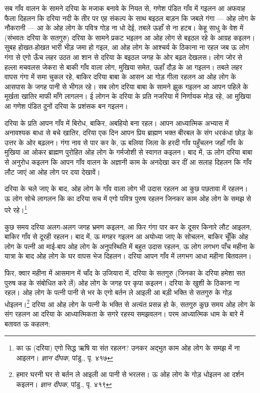 सब गाँव वालन के सामने दरिया के मजाक बनावे के नियत से, गणेश पंडित गाँव में गइलन आ अफवाह फैला दिहलन कि दरिया नदी के तीर पर एह संकल्प के साथ बइठल बाड़न कि जबले गंगा — ओह लोग के नौकरानी — आ के ओह लोग के पवित्र गोड़ ना धो देई, तबले ऊहाँ से ना हटब। केहू साधु के वेश में (संभवतः दरिया के सतगुरु) दरिया के सामने प्रकट भइलन आ ओह लोग से बइठल रहे के आग्रह कइलन। सुबह होखत-होखत भारी भीड़ जमा हो गइल, आ ओह लोग के आश्चर्य के ठिकाना ना रहल जब ऊ लोग गंगा से एगो ऊँच लहर उठत आ शान से दरिया के बइठल जगह के ओर बढ़त देखलस। लोग जोर से हल्ला मचवलस जेकरा से बाकी गाँव वाला लोग, मुखिया समेत, ऊहाँ दौड़ के आ गइलन। तबले लहर वापस गंगा में समा चुकल रहे, बाकिर दरिया बाबा के आसन आ गोड़ गीला रहलन आ ओह लोग के आसपास के जगह पानी से भीगल रहे। सब लोग दरिया बाबा के सामने झुक गइलन आ आपन पहिले के मूर्खता खातिर माफी माँगे लागलन। ई लोगन के दरिया के प्रति नजरिया में निर्णायक मोड़ रहे, आ मुखिया आ गणेश पंडित दुनों दरिया के प्रशंसक बन गइलन।

दरिया के प्रति आपन गाँव में बिरोध, बाकिर, अबहियो बना रहल। आपन आध्यात्मिक अभ्यास में अनावश्यक बाधा से बचे खातिर, दरिया एक दिन आपन प्रिय ब्राह्मण भक्त बीरबल के संग धरकंधा छोड़ के उत्तर के ओर बढ़लन। गंगा नाव से पार कर के, ऊ बलिया जिला के हरदी गाँव पहुँचलन जहाँ गाँव के मुखिया आ ओकर ब्राह्मण पुरोहित ओह लोग के गर्मजोशी से स्वागत कइलन। बाद में, ऊ लोग दरिया बाबा से अनुरोध कइलन कि आपन गाँव वालन के अज्ञानी काम के अनदेखा कर दीं आ सलाह दिहलन कि गाँव लौट जाएं आ ओह लोग पर दया देखावें।

दरिया के चले जाए के बाद, ओह लोग के गाँव वाला लोग भी उदास रहलन आ कुछ पछतावा में रहलन। ऊ लोग सोचे लागलन कि का दरिया सच में एगो पवित्र पुरुष रहलन जिनकर काम ओह लोग के समझ से परे रहे।\footnote{का ऊ (दरिया) एगो सिद्ध ऋषि या संत रहलन? उनकर अद्भुत काम ओह लोग के समझ में ना आइलन। \textit{ज्ञान दीपक}, पांडु., पृ. ४१७}

कुछ समय दरिया अलग-अलग जगह भ्रमण कइलन, आ फिर गंगा पार कर के दूसर किनारे लौट आइलन, बाकिर गाँव से दूरही रहलन। बाद में, ऊ मगहर गइलन आ अयोध्या जाए के सोचलन, बाकिर चूँकि ओह लोग के पत्नी आ माई-बाप ओह लोग के अनुपस्थिति में बहुत उदास रहलन, ऊ लोग लगभग पाँच महीना के यात्रा के बाद ओह लोग के घर वापस भेज दिहलन। दरिया आपन गाँव में लगभग आधा महीना बितवलन।

फिर, क्वार महीना में आसमान में चाँद के उजियारा में, दरिया के सतगुरु (जिनका के दरिया हमेशा सत पुरुष कह के संबोधित करे लें) ओह लोग के जगह पर कृपा कइलन। दरिया के खुशी के ठिकाना ना रहल। ओह लोग के पत्नी पानी से भर के एगो बर्तन ले आइली आ बड़ी भक्ति से सतगुरु के गोड़ धोइलन।\footnote{हमार घरनी घर से बर्तन ले आइली आ पानी से भरलस। ऊ ओह लोग के गोड़ धोइलन आ दर्शन कइलन। \textit{ज्ञान दीपक}, पांडु., पृ. ४१९} दरिया आ ओह लोग के पत्नी के भक्ति से अत्यंत प्रसन्न हो के, सतगुरु कुछ समय ओह लोग के संग रहलन आ दरिया के आध्यात्मिकता के सगरे रहस्य समझवलन। परम आध्यात्मिक धाम के बारे में बतावत ऊ कहलन:

